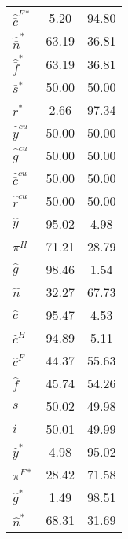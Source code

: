 \begin{center}
\begin{longtable}{lcc}
${\hat {\bar c}^{F*}}  $	 & 	              5.20	 & 	             94.80 \\ 
${\hat {\bar n}^*}     $	 & 	             63.19	 & 	             36.81 \\ 
${\hat {\bar f}^*}     $	 & 	             63.19	 & 	             36.81 \\ 
${\bar s^*}            $	 & 	             50.00	 & 	             50.00 \\ 
${\bar r^*}            $	 & 	              2.66	 & 	             97.34 \\ 
${\hat {\bar y}^{cu}}  $	 & 	             50.00	 & 	             50.00 \\ 
${\hat {\bar g}^{cu}}  $	 & 	             50.00	 & 	             50.00 \\ 
${\hat {\bar c}^{cu}}  $	 & 	             50.00	 & 	             50.00 \\ 
${\hat {\bar r}^{cu}}  $	 & 	             50.00	 & 	             50.00 \\ 
${\hat y}              $	 & 	             95.02	 & 	              4.98 \\ 
${\pi^H}               $	 & 	             71.21	 & 	             28.79 \\ 
${\hat g}              $	 & 	             98.46	 & 	              1.54 \\ 
${\hat n}              $	 & 	             32.27	 & 	             67.73 \\ 
${\hat c}              $	 & 	             95.47	 & 	              4.53 \\ 
${\hat c^H}            $	 & 	             94.89	 & 	              5.11 \\ 
${\hat c^F}            $	 & 	             44.37	 & 	             55.63 \\ 
${\hat f}              $	 & 	             45.74	 & 	             54.26 \\ 
${s}                   $	 & 	             50.02	 & 	             49.98 \\ 
${i}                   $	 & 	             50.01	 & 	             49.99 \\ 
${\hat y^*}            $	 & 	              4.98	 & 	             95.02 \\ 
${\pi^{F*}}            $	 & 	             28.42	 & 	             71.58 \\ 
${\hat g^*}            $	 & 	              1.49	 & 	             98.51 \\ 
${\hat n^*}            $	 & 	             68.31	 & 	             31.69 \\ 

\end{longtable}
\end{center}
